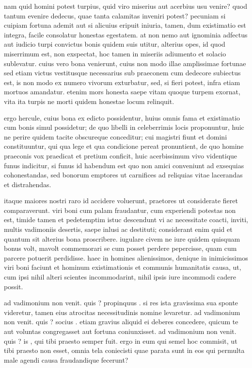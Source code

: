 nam quid homini potest turpius, quid viro miserius aut acerbius usu venire? quod tantum evenire dedecus, quae tanta calamitas inveniri potest? pecuniam si cuipiam fortuna ademit aut si alicuius eripuit iniuria, tamen, dum existimatio est integra, facile consolatur honestas egestatem. at non nemo aut ignominia adfectus aut iudicio turpi convictus bonis quidem suis utitur, alterius opes, id quod miserrimum est, non exspectat, hoc tamen in miseriis adiumento et solacio sublevatur. cuius vero bona venierunt, cuius non modo illae amplissimae fortunae sed etiam victus vestitusque necessarius sub praeconem cum dedecore subiectus est, is non modo ex numero vivorum exturbatur, sed, si fieri potest, infra etiam mortuos amandatur. etenim mors honesta saepe vitam quoque turpem exornat, vita ita turpis ne morti quidem honestae locum relinquit.

 ergo hercule, cuius bona ex edicto possidentur, huius omnis fama et existimatio cum bonis simul possidetur; de quo libelli in celeberrimis locis proponuntur, huic ne perire quidem tacite obscureque conceditur; cui magistri fiunt et domini constituuntur, qui qua lege et qua condicione pereat pronuntient, de quo homine praeconis vox praedicat et pretium conficit, huic acerbissimum vivo videntique funus indicitur, si funus id habendum est quo non amici conveniunt ad exsequias cohonestandas, sed bonorum emptores ut carnifices ad reliquias vitae lacerandas et distrahendas.

 itaque maiores nostri raro id accidere voluerunt, praetores ut considerate fieret comparaverunt. viri boni cum palam fraudantur, cum experiendi potestas non est, timide tamen et pedetemptim istuc descendunt vi ac necessitate coacti, inviti, multis vadimoniis desertis, saepe inlusi ac destituti; considerant enim quid et quantum sit alterius bona proscribere. iugulare civem ne iure quidem quisquam bonus volt, mavolt commemorari se cum posset perdere pepercisse, quam cum parcere potuerit perdidisse. haec in homines alienissimos, denique in inimicissimos viri boni faciunt et hominum existimationis et communis humanitatis causa, ut, cum ipsi nihil alteri scientes incommodarint, nihil ipsis iure incommodi cadere possit.

 ad vadimonium non venit. quis ? propinquus . si res ista gravissima sua sponte videretur, tamen eius atrocitas necessitudinis nomine levaretur. ad vadimonium non venit. quis ? socius . etiam gravius aliquid ei deberes concedere, quicum te aut voluntas congregasset aut fortuna coniunxisset. ad vadimonium non venit. quis ? is , qui tibi praesto semper fuit. ergo in eum qui semel hoc commisit, ut tibi praesto non esset, omnia tela coniecisti quae parata sunt in eos qui permulta male agendi causa fraudandique fecerunt?

